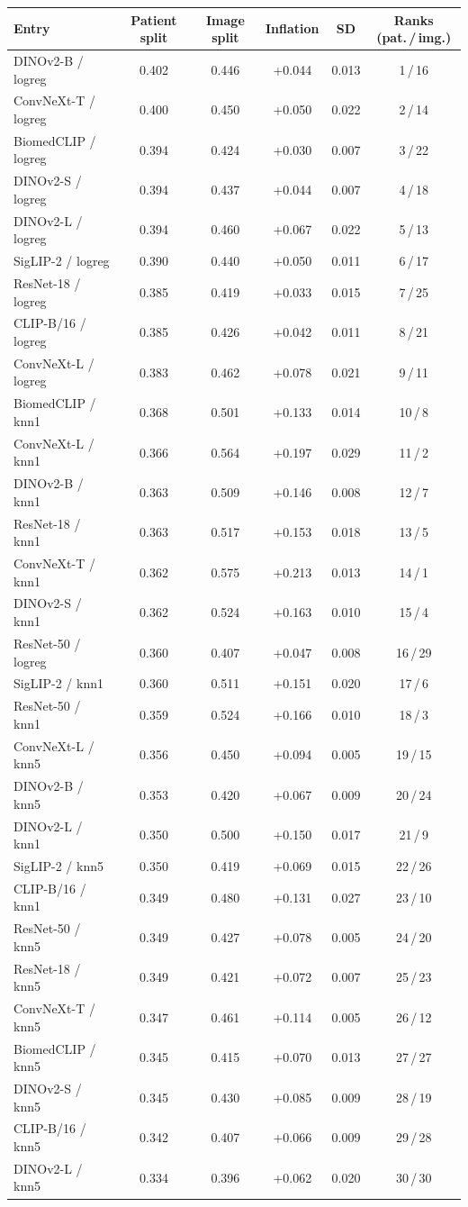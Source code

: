\begin{tabular}{@{}lccccc@{}}\toprule
Entry & Patient split & Image split & Inflation & SD & Ranks (pat.\,/\,img.)\\\midrule
DINOv2-B / logreg & 0.402 & 0.446 & +0.044 & 0.013 & 1\,/\,16\\
ConvNeXt-T / logreg & 0.400 & 0.450 & +0.050 & 0.022 & 2\,/\,14\\
BiomedCLIP / logreg & 0.394 & 0.424 & +0.030 & 0.007 & 3\,/\,22\\
DINOv2-S / logreg & 0.394 & 0.437 & +0.044 & 0.007 & 4\,/\,18\\
DINOv2-L / logreg & 0.394 & 0.460 & +0.067 & 0.022 & 5\,/\,13\\
SigLIP-2 / logreg & 0.390 & 0.440 & +0.050 & 0.011 & 6\,/\,17\\
ResNet-18 / logreg & 0.385 & 0.419 & +0.033 & 0.015 & 7\,/\,25\\
CLIP-B/16 / logreg & 0.385 & 0.426 & +0.042 & 0.011 & 8\,/\,21\\
ConvNeXt-L / logreg & 0.383 & 0.462 & +0.078 & 0.021 & 9\,/\,11\\
BiomedCLIP / knn1 & 0.368 & 0.501 & +0.133 & 0.014 & 10\,/\,8\\
ConvNeXt-L / knn1 & 0.366 & 0.564 & +0.197 & 0.029 & 11\,/\,2\\
DINOv2-B / knn1 & 0.363 & 0.509 & +0.146 & 0.008 & 12\,/\,7\\
ResNet-18 / knn1 & 0.363 & 0.517 & +0.153 & 0.018 & 13\,/\,5\\
ConvNeXt-T / knn1 & 0.362 & 0.575 & +0.213 & 0.013 & 14\,/\,1\\
DINOv2-S / knn1 & 0.362 & 0.524 & +0.163 & 0.010 & 15\,/\,4\\
ResNet-50 / logreg & 0.360 & 0.407 & +0.047 & 0.008 & 16\,/\,29\\
SigLIP-2 / knn1 & 0.360 & 0.511 & +0.151 & 0.020 & 17\,/\,6\\
ResNet-50 / knn1 & 0.359 & 0.524 & +0.166 & 0.010 & 18\,/\,3\\
ConvNeXt-L / knn5 & 0.356 & 0.450 & +0.094 & 0.005 & 19\,/\,15\\
DINOv2-B / knn5 & 0.353 & 0.420 & +0.067 & 0.009 & 20\,/\,24\\
DINOv2-L / knn1 & 0.350 & 0.500 & +0.150 & 0.017 & 21\,/\,9\\
SigLIP-2 / knn5 & 0.350 & 0.419 & +0.069 & 0.015 & 22\,/\,26\\
CLIP-B/16 / knn1 & 0.349 & 0.480 & +0.131 & 0.027 & 23\,/\,10\\
ResNet-50 / knn5 & 0.349 & 0.427 & +0.078 & 0.005 & 24\,/\,20\\
ResNet-18 / knn5 & 0.349 & 0.421 & +0.072 & 0.007 & 25\,/\,23\\
ConvNeXt-T / knn5 & 0.347 & 0.461 & +0.114 & 0.005 & 26\,/\,12\\
BiomedCLIP / knn5 & 0.345 & 0.415 & +0.070 & 0.013 & 27\,/\,27\\
DINOv2-S / knn5 & 0.345 & 0.430 & +0.085 & 0.009 & 28\,/\,19\\
CLIP-B/16 / knn5 & 0.342 & 0.407 & +0.066 & 0.009 & 29\,/\,28\\
DINOv2-L / knn5 & 0.334 & 0.396 & +0.062 & 0.020 & 30\,/\,30\\
\bottomrule\end{tabular}
